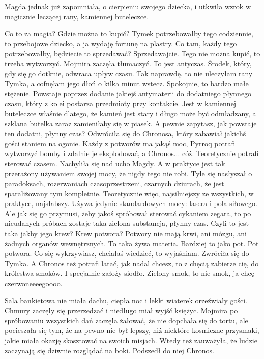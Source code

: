 Magda jednak już zapomniała, o cierpieniu swojego dziecka, i utkwiła wzrok w magicznie leczącej rany, kamiennej buteleczce.

\begin{dialogue}
\ds{} Co to za magia? Gdzie można to kupić? Tymek potrzebowałby tego codziennie, to przebojowe dziecko, a ja wydaję fortunę na plastry.
Co tam, każdy tego potrzebowałby, będziecie to sprzedawać? Sprzedawajcie.
\ds{} Tego nie można kupić, to trzeba wytworzyć. \dm{} Mojmira zaczęła tłumaczyć. \dm{} To jest antyczas. Środek, który, gdy się go dotknie, odwraca upływ czasu. 
Tak naprawdę, to nie uleczyłam rany Tymka, a cofnęłam jego dłoń o kilka minut wstecz. Spokojnie, to bardzo małe stężenie.
Powstaje poprzez dodanie jakiejś antymaterii do dodatniego płynnego czasu, który z kolei postarza przedmioty przy kontakcie. 
Jest w kamiennej buteleczce właśnie dlatego, że kamień jest stary i długo może być odmładzany, a szklana butelka zaraz zamieniłaby się w piasek.
A pewnie zapytasz, jak powstaje ten dodatni, płynny czas? 
\dm{} Odwróciła się do Chronosa, który zabawiał jakichś gości staniem na ogonie. \dm{} 
Każdy z potworów ma jakąś moc, Pyrroq potrafi wytworzyć bomby i zdalnie je eksplodować, a Chronos... cóż. Teoretycznie potrafi sterować czasem.
\dm{} Nachyliła się nad ucho Magdy. \dm{} A w praktyce jest tak przerażony używaniem swojej mocy, że nigdy tego nie robi.
Tyle się nasłyszał o paradoksach, rozerwaniach czasoprzestrzeni, czarnych dziurach, że jest sparaliżowany tym kompletnie.
Teoretycznie więc, najsilniejszy ze wszystkich, w praktyce, najsłabszy.
Używa jedynie standardowych mocy: lasera i pola siłowego.
Ale jak się go przymusi, żeby jakoś spróbował sterować cykaniem zegara, to po nieudanych próbach zostaje taka zielona substancja, płynny czas.
\ds{} Czyli to jest taka jakby jego krew? Krew potwora?
\ds{} Potwory nie mają krwi, ani mózgu, ani żadnych organów wewnętrznych. To taka żywa materia. 
Bardziej to jako pot. Pot potwora. Co się wykrzywiasz, chciałaś wiedzieć, to wyjaśniam. \dm{} Zwróciła się do Tymka. \dm{}
A Chronos też potrafi latać, jak nadal chcesz, to z chęcią zabierze cię, do królestwa smoków. I specjalnie założy siodło.
\ds{} Zielony smok, to nie smok, ja chcę czerwoneeeegoooo.
\end{dialogue}

\divider{}

Sala bankietowa nie miała dachu, ciepła noc i lekki wiaterek orzeźwiały gości.
Chmury zaczęły się przerzedzać i niedługo miał wyjść księżyc.
Mojmira po spróbowaniu wszystkich dań zaczęła żałować, że nie dopchała się do tortu, ale pocieszała się tym, 
że na pewno nie był lepszy, niż niektóre kosmiczne przysmaki, jakie miała okazję skosztować na swoich misjach.
Wtedy też zauważyła, że ludzie zaczynają się dziwnie rozglądać na boki. 
Podszedł do niej Chronos.

